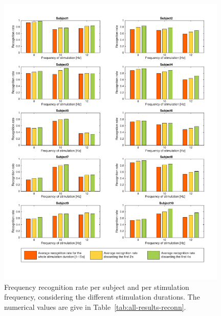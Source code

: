\documentclass[smallextended]{svjour3}
\begin{document}
\begin{figure}
\center
\includegraphics[width=0.98\textwidth]{figures/all-results-reconn.pdf}
\caption{Frequency recognition rate per subject and per stimulation frequency, considering the different stimulation durations. The numerical values are give in Table~\ref{tab:all-results-reconn}.}
\label{fig:all-results-reconn}
\end{figure}
\end{document}
